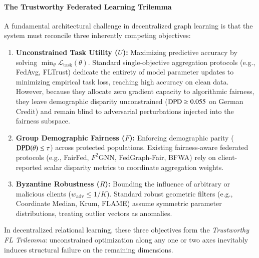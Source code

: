 \paragraph{The Trustworthy Federated Learning Trilemma}
A fundamental architectural challenge in decentralized graph learning is that the system must reconcile three inherently competing objectives:
\begin{enumerate}[leftmargin=*]
    \item \textbf{Unconstrained Task Utility ($U$):} Maximizing predictive accuracy by solving $\min_\theta \mathcal{L}_{\mathrm{task}}(\theta)$. Standard single-objective aggregation protocols (e.g., FedAvg, FLTrust) dedicate the entirety of model parameter updates to minimizing empirical task loss, reaching high accuracy on clean data. However, because they allocate zero gradient capacity to algorithmic fairness, they leave demographic disparity unconstrained ($\mathrm{DPD} \ge 0.055$ on German Credit) and remain blind to adversarial perturbations injected into the fairness subspace.
    \item \textbf{Group Demographic Fairness ($F$):} Enforcing demographic parity ($\mathrm{DPD}(\theta) \le \tau$) across protected populations. Existing fairness-aware federated protocols (e.g., FairFed, $F^2\text{GNN}$, FedGraph-Fair, BFWA) rely on client-reported scalar disparity metrics to coordinate aggregation weights.
    \item \textbf{Byzantine Robustness ($R$):} Bounding the influence of arbitrary or malicious clients ($w_{\mathrm{adv}} \le 1/K$). Standard robust geometric filters (e.g., Coordinate Median, Krum, FLAME) assume symmetric parameter distributions, treating outlier vectors as anomalies.
\end{enumerate}
In decentralized relational learning, these three objectives form the \emph{Trustworthy FL Trilemma}: unconstrained optimization along any one or two axes inevitably induces structural failure on the remaining dimensions.

